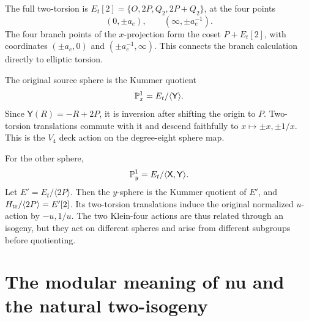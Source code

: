 The full two-torsion is \(E_t[2]=\{O,2P,Q_2,2P+Q_2\}\), at the four points
\[
(0,\pm a_e),\qquad(\infty,\pm a_e^{-1}).
\]
The four branch points of the \(x\)-projection form the coset \(P+E_t[2]\), with coordinates \((\pm a_e,0)\) and \((\pm a_e^{-1},\infty)\). This connects the branch calculation directly to elliptic torsion.

The original source sphere is the Kummer quotient
\begin{equation}\label{eq:Kummerx}
\mathbb P^1_x=E_t/\langle\mathsf Y\rangle.
\end{equation}
Since \(\mathsf Y(R)=-R+2P\), it is inversion after shifting the origin to \(P\). Two-torsion translations commute with it and descend faithfully to \(x\mapsto\pm x,\pm1/x\). This is the \(V_4\) deck action on the degree-eight sphere map.

For the other sphere,
\[
\mathbb P^1_y=E_t/\langle\mathsf X,\mathsf Y\rangle.
\]
Let \(E'=E_t/\langle2P\rangle\). Then the \(y\)-sphere is the Kummer quotient of \(E'\), and
\(H_{\rm tr}/\langle2P\rangle=E'[2]\). Its two-torsion translations induce the original normalized \(u\)-action by \(-u,1/u\). The two Klein-four actions are thus related through an isogeny, but they act on different spheres and arise from different subgroups before quotienting.

\section{The modular meaning of nu and the natural two-isogeny}\label{sec:modular}

